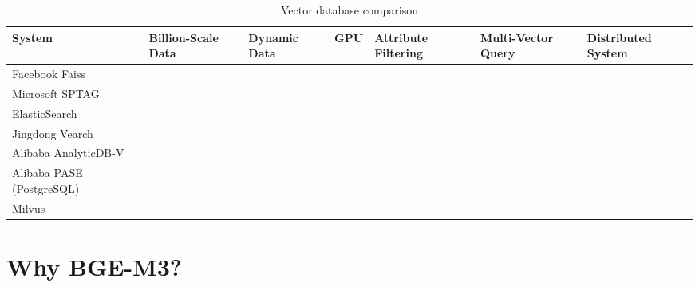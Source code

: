 \begin{table}[H]
	\hspace{-1.5cm}
	\begin{tabular}{lp{2cm}p{1.5cm}p{1cm}p{1.6cm}p{2cm}p{2cm}}
		\hline
		\textbf{System}                   & \textbf{Billion-Scale Data} & \textbf{Dynamic Data} & \textbf{GPU} & \textbf{Attribute Filtering} & \textbf{Multi-Vector Query} & \textbf{Distributed System} \\ \hline
		Facebook Faiss \cite{douze2024faiss, johnson2017similarity}      & \checkmark                  & \xmark                & \checkmark  & \xmark                     & \xmark                      & \xmark                     \\ \hline
		Microsoft SPTAG \cite{ChenW18}     & \checkmark                  & \xmark                & \checkmark  & \xmark                     & \xmark                      & \checkmark                 \\ \hline
		ElasticSearch \cite{elasticsearch} & \xmark                      & \checkmark            & \xmark      & \checkmark                 & \xmark                      & \checkmark                 \\ \hline
		Jingdong Vearch \cite{li2019visualsearch, li2019design}    & \checkmark                  & \checkmark            & \checkmark  & \checkmark                 & \xmark                      & \checkmark                 \\ \hline
		Alibaba AnalyticDB-V \cite{wei2020analyticdbv} & \checkmark              & \checkmark            & \xmark      & \xmark                     & \xmark                      & \checkmark                 \\ \hline
		Alibaba PASE (PostgreSQL) \cite{pase2020} & \xmark                  & \checkmark            & \xmark      & \checkmark                 & \xmark                      & \checkmark                 \\ \hline
		\rowcolor[HTML]{D3D3D3} 
		Milvus \cite{wang2021milvus}              & \checkmark                  & \checkmark            & \checkmark  & \checkmark                 & \checkmark                  & \checkmark                 \\ \hline
	\end{tabular}
	\caption{Vector database comparison}
\end{table}

\section{Why BGE-M3?}

